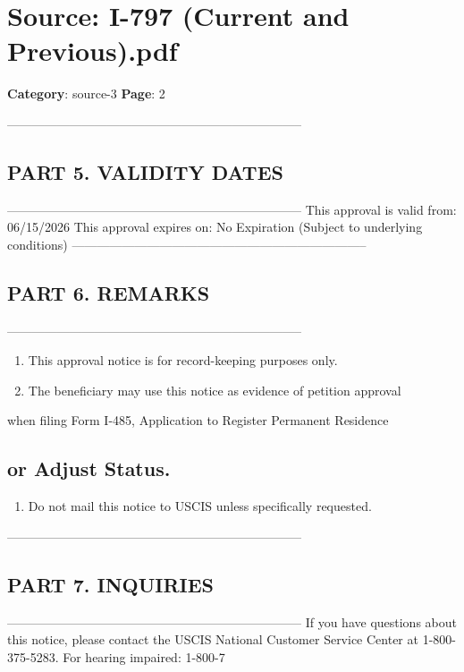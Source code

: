 \newpage

\section*{Source: I-797 (Current and Previous).pdf}
\textbf{Category}: source-3
\textbf{Page}: 2

-----------------------------------------------------------------------

\subsection*{PART 5. VALIDITY DATES}

----------------------------------------------------------------------- This approval is valid from: 06/15/2026 This approval expires on: No Expiration (Subject to underlying conditions) -----------------------------------------------------------------------

\subsection*{PART 6. REMARKS}

-----------------------------------------------------------------------

\begin{enumerate}

\item This approval notice is for record-keeping purposes only.

\item The beneficiary may use this notice as evidence of petition approval

\end{enumerate}

when filing Form I-485, Application to Register Permanent Residence

\subsection*{or Adjust Status.}

\begin{enumerate}

\item Do not mail this notice to USCIS unless specifically requested.

\end{enumerate}

-----------------------------------------------------------------------

\subsection*{PART 7. INQUIRIES}

----------------------------------------------------------------------- If you have questions about this notice, please contact the USCIS National Customer Service Center at 1-800-375-5283. For hearing impaired: 1-800-7